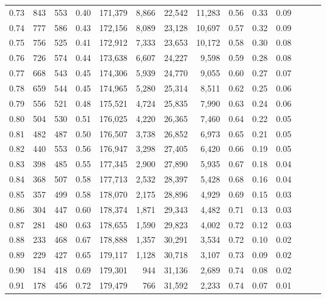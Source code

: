 \begin{tabular}{rrrrrrrrrrrrrr}
0.73 &    843 &  553 &  0.40 &  171,379 &    8,866 &  22,542 &  11,283 &  0.56 &  0.33 &      0.09 \\
0.74 &    777 &  586 &  0.43 &  172,156 &    8,089 &  23,128 &  10,697 &  0.57 &  0.32 &      0.09 \\
0.75 &    756 &  525 &  0.41 &  172,912 &    7,333 &  23,653 &  10,172 &  0.58 &  0.30 &      0.08 \\
0.76 &    726 &  574 &  0.44 &  173,638 &    6,607 &  24,227 &   9,598 &  0.59 &  0.28 &      0.08 \\
0.77 &    668 &  543 &  0.45 &  174,306 &    5,939 &  24,770 &   9,055 &  0.60 &  0.27 &      0.07 \\
0.78 &    659 &  544 &  0.45 &  174,965 &    5,280 &  25,314 &   8,511 &  0.62 &  0.25 &      0.06 \\
0.79 &    556 &  521 &  0.48 &  175,521 &    4,724 &  25,835 &   7,990 &  0.63 &  0.24 &      0.06 \\
0.80 &    504 &  530 &  0.51 &  176,025 &    4,220 &  26,365 &   7,460 &  0.64 &  0.22 &      0.05 \\
0.81 &    482 &  487 &  0.50 &  176,507 &    3,738 &  26,852 &   6,973 &  0.65 &  0.21 &      0.05 \\
0.82 &    440 &  553 &  0.56 &  176,947 &    3,298 &  27,405 &   6,420 &  0.66 &  0.19 &      0.05 \\
0.83 &    398 &  485 &  0.55 &  177,345 &    2,900 &  27,890 &   5,935 &  0.67 &  0.18 &      0.04 \\
0.84 &    368 &  507 &  0.58 &  177,713 &    2,532 &  28,397 &   5,428 &  0.68 &  0.16 &      0.04 \\
0.85 &    357 &  499 &  0.58 &  178,070 &    2,175 &  28,896 &   4,929 &  0.69 &  0.15 &      0.03 \\
0.86 &    304 &  447 &  0.60 &  178,374 &    1,871 &  29,343 &   4,482 &  0.71 &  0.13 &      0.03 \\
0.87 &    281 &  480 &  0.63 &  178,655 &    1,590 &  29,823 &   4,002 &  0.72 &  0.12 &      0.03 \\
0.88 &    233 &  468 &  0.67 &  178,888 &    1,357 &  30,291 &   3,534 &  0.72 &  0.10 &      0.02 \\
0.89 &    229 &  427 &  0.65 &  179,117 &    1,128 &  30,718 &   3,107 &  0.73 &  0.09 &      0.02 \\
0.90 &    184 &  418 &  0.69 &  179,301 &      944 &  31,136 &   2,689 &  0.74 &  0.08 &      0.02 \\
0.91 &    178 &  456 &  0.72 &  179,479 &      766 &  31,592 &   2,233 &  0.74 &  0.07 &      0.01 \\

\end{tabular}
